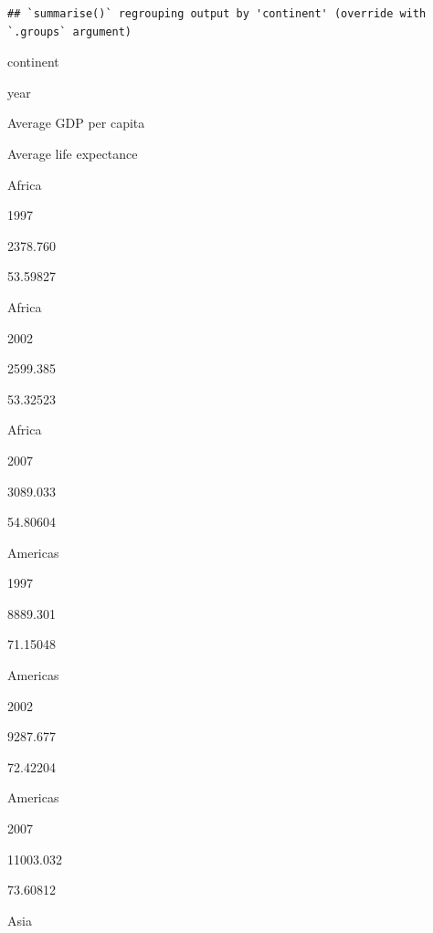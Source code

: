 \documentclass[
]{book}
\newenvironment{Shaded}{\begin{snugshade}}{\end{snugshade}}
\newcommand{\DataTypeTok}[1]{\textcolor[rgb]{0.13,0.29,0.53}{#1}}
\newcommand{\DecValTok}[1]{\textcolor[rgb]{0.00,0.00,0.81}{#1}}
\newcommand{\KeywordTok}[1]{\textcolor[rgb]{0.13,0.29,0.53}{\textbf{#1}}}
\newcommand{\NormalTok}[1]{#1}
\newcommand{\OperatorTok}[1]{\textcolor[rgb]{0.81,0.36,0.00}{\textbf{#1}}}
\newcommand{\StringTok}[1]{\textcolor[rgb]{0.31,0.60,0.02}{#1}}
\begin{document}
\begin{Shaded}
\end{Shaded}

\begin{verbatim}
## `summarise()` regrouping output by 'continent' (override with `.groups` argument)
\end{verbatim}

continent

year

Average GDP per capita

Average life expectance

Africa

1997

2378.760

53.59827

Africa

2002

2599.385

53.32523

Africa

2007

3089.033

54.80604

Americas

1997

8889.301

71.15048

Americas

2002

9287.677

72.42204

Americas

2007

11003.032

73.60812

Asia
\end{document}
